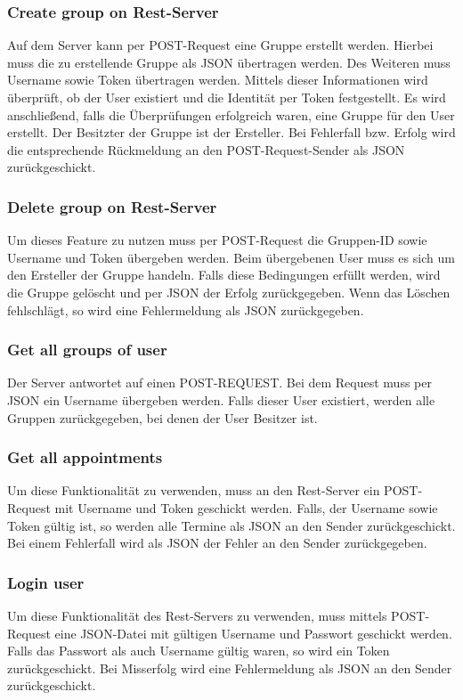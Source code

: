 \documentclass[12pt]{scrartcl}
\begin{document}
    \subsubsection{Create group on Rest-Server}
        Auf dem Server kann per POST-Request eine Gruppe erstellt werden.
        Hierbei muss die zu erstellende Gruppe als JSON übertragen werden.
        Des Weiteren muss Username sowie Token übertragen werden.
        Mittels dieser Informationen wird überprüft, ob der User existiert und die Identität 
        per Token festgestellt. Es wird anschließend, falls die Überprüfungen erfolgreich waren,
        eine Gruppe für den User erstellt. Der Besitzter der Gruppe ist der Ersteller.
        Bei Fehlerfall bzw. Erfolg wird die entsprechende Rückmeldung an den POST-Request-Sender 
        als JSON zurückgeschickt.

    \subsubsection{Delete group on Rest-Server}
        Um dieses Feature zu nutzen muss per POST-Request die Gruppen-ID sowie Username und Token übergeben werden.
        Beim übergebenen User muss es sich um den Ersteller der Gruppe handeln.
        Falls diese Bedingungen erfüllt werden, wird die Gruppe gelöscht und per JSON der Erfolg zurückgegeben.
        Wenn das Löschen fehlschlägt, so wird eine Fehlermeldung als JSON zurückgegeben. 

    \subsubsection{Get all groups of user}
        Der Server antwortet auf einen POST-REQUEST. Bei dem Request muss per JSON ein Username übergeben werden.
        Falls dieser User existiert, werden alle Gruppen zurückgegeben, bei denen der User Besitzer ist.
        
    \subsubsection{Get all appointments}
        Um diese Funktionalität zu verwenden, muss an den Rest-Server ein POST-Request mit Username und Token geschickt werden.
        Falls, der Username sowie Token gültig ist, so werden alle Termine als JSON an den Sender zurückgeschickt.
        Bei einem Fehlerfall wird als JSON der Fehler an den Sender zurückgegeben.
    
    \subsubsection{Login user}
        Um diese Funktionalität des Rest-Servers zu verwenden, muss mittels POST-Request eine 
        JSON-Datei mit gültigen Username und Passwort geschickt werden.
        Falls das Passwort als auch Username gültig waren, so wird ein Token zurückgeschickt.
        Bei Misserfolg wird eine Fehlermeldung als JSON an den Sender zurückgeschickt.
\end{document}
